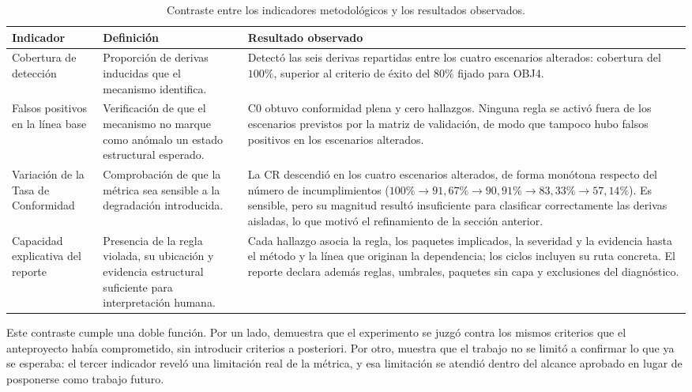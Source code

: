 \begin{table}[H]
\centering
\caption{Contraste entre los indicadores metodológicos y los resultados observados.}
\label{tab:indicadores}
\footnotesize
\begin{tabularx}{\textwidth}{p{3.2cm}XX}
\toprule
\textbf{Indicador} & \textbf{Definición} & \textbf{Resultado observado} \\
\midrule
Cobertura de detección &
Proporción de derivas inducidas que el mecanismo identifica. &
Detectó las seis derivas repartidas entre los cuatro escenarios alterados: cobertura del $100\%$, superior al criterio de éxito del $80\%$ fijado para OBJ4. \\
\midrule
Falsos positivos en la línea base &
Verificación de que el mecanismo no marque como anómalo un estado estructural esperado. &
C0 obtuvo conformidad plena y cero hallazgos. Ninguna regla se activó fuera de los escenarios previstos por la matriz de validación, de modo que tampoco hubo falsos positivos en los escenarios alterados. \\
\midrule
Variación de la Tasa de Conformidad &
Comprobación de que la métrica sea sensible a la degradación introducida. &
La CR descendió en los cuatro escenarios alterados, de forma monótona respecto del número de incumplimientos ($100\% \rightarrow 91{,}67\% \rightarrow 90{,}91\% \rightarrow 83{,}33\% \rightarrow 57{,}14\%$). Es sensible, pero su magnitud resultó insuficiente para clasificar correctamente las derivas aisladas, lo que motivó el refinamiento de la sección anterior. \\
\midrule
Capacidad explicativa del reporte &
Presencia de la regla violada, su ubicación y evidencia estructural suficiente para interpretación humana. &
Cada hallazgo asocia la regla, los paquetes implicados, la severidad y la evidencia hasta el método y la línea que originan la dependencia; los ciclos incluyen su ruta concreta. El reporte declara además reglas, umbrales, paquetes sin capa y exclusiones del diagnóstico. \\
\bottomrule
\end{tabularx}
\end{table}

Este contraste cumple una doble función. Por un lado, demuestra que el experimento se juzgó contra los mismos criterios que el anteproyecto había comprometido, sin introducir criterios a posteriori. Por otro, muestra que el trabajo no se limitó a confirmar lo que ya se esperaba: el tercer indicador reveló una limitación real de la métrica, y esa limitación se atendió dentro del alcance aprobado en lugar de posponerse como trabajo futuro.

